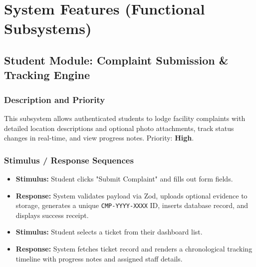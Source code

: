 \documentclass[12pt, a4paper]{article}
\begin{document}
\section{System Features (Functional Subsystems)}

\subsection{Student Module: Complaint Submission \& Tracking Engine}

\subsubsection{Description and Priority}
This subsystem allows authenticated students to lodge facility complaints with detailed location descriptions and optional photo attachments, track status changes in real-time, and view progress notes. Priority: \textbf{High}.

\subsubsection{Stimulus / Response Sequences}
\begin{itemize}[leftmargin=*]
    \item \textbf{Stimulus:} Student clicks "Submit Complaint" and fills out form fields.
    \item \textbf{Response:} System validates payload via Zod, uploads optional evidence to storage, generates a unique \texttt{CMP-YYYY-XXXX} ID, inserts database record, and displays success receipt.
    \item \textbf{Stimulus:} Student selects a ticket from their dashboard list.
    \item \textbf{Response:} System fetches ticket record and renders a chronological tracking timeline with progress notes and assigned staff details.
\end{itemize}
\end{document}
